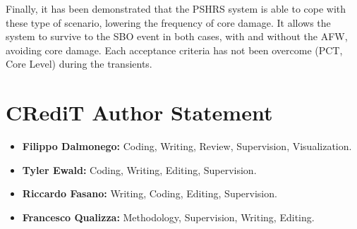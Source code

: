 \documentclass[a4paper,11pt]{article}
\numberwithin{subsubsection}{subsection}
\numberwithin{subsection}{section}
\begin{document}
Finally, it has been demonstrated that the PSHRS system is able to cope with these type of scenario, lowering the frequency of core damage. It allows the system to survive to the SBO event in both cases, with and without the AFW, avoiding core damage. Each acceptance criteria has not been overcome (PCT, Core Level) during the transients. 


\newpage

\section*{CRediT Author Statement}

\begin{itemize}
    \item \textbf{Filippo Dalmonego:} Coding, Writing, Review, Supervision, Visualization.
    \item \textbf{Tyler Ewald:} Coding, Writing, Editing, Supervision.
    \item \textbf{Riccardo Fasano:} Writing, Coding, Editing, Supervision.
    \item \textbf{Francesco Qualizza:} Methodology, Supervision, Writing, Editing.
\end{itemize}

\printbibliography
\end{document}
